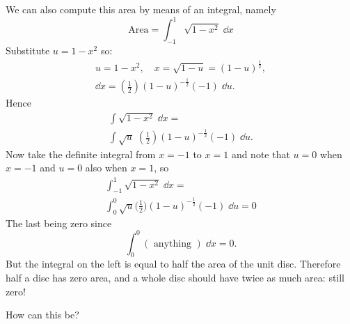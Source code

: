 \begin{multicols}{2}
\noindent%

We can also compute this area by means of an integral, namely
\[
\text{Area} = \int_{-1}^1 \sqrt{1-x^2}\;\dd x
\]
Substitute $u=1-x^2$ so: 
\begin{gather*}
  u=1-x^2,\quad
  x=\sqrt{1-u}=(1-u)^{\frac12},\\
  \dd x=(\frac12)(1-u)^{-\frac12}(-1)\;\dd u.
\end{gather*}
Hence
\begin{multline*}
  \int \sqrt{1-x^2}\;\dd x =\\
  \int \sqrt{u}\; (\frac12)(1-u)^{-\frac12}(-1)\;\dd u.
\end{multline*}
Now take the definite integral from $x=-1$ to $x=1$ and note that
$u=0$ when $x=-1$ and $u=0$ also when $x=1$, so
\begin{multline*}
  \int_{-1}^1 \sqrt{1-x^2}\;\dd x =\\
  \int_0^0 \sqrt{u} \bigl(\frac12\bigr)(1-u)^{-\frac12}(-1)\;\dd u=0
\end{multline*}
The last being zero since
\[
\int_0^0(\text{ anything })\;\dd x = 0.
\]
But the integral on the left is equal to half the area of the unit disc.
Therefore half a disc has zero area, and a whole disc should have twice
as much area: still zero!

How can this be?



\end{multicols}
\noproblemfont


